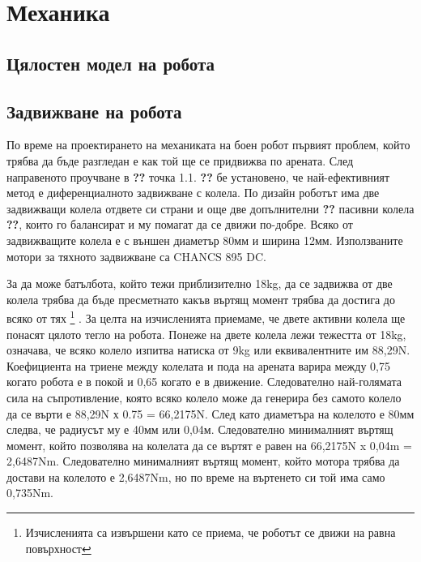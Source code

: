\chapter{Механика}

 
\section{Цялостен модел на робота}


\section{Задвижване на робота}

По време на проектирането на механиката на боен робот първият проблем, който трябва да бъде разгледан е как той ще се придвижва по арената. След направеното проучване в \textbf{??} точка 1.1. \textbf{??} бе установено, че най-ефективният метод е диференциалното задвижване с колела. По дизайн роботът има две задвижващи колела отдвете си страни и още две допълнителни \textbf{??} пасивни колела \textbf{??}, които го балансират и му помагат да се движи по-добре. Всяко от задвижващите колела е с външен диаметър 80мм и ширина 12мм. Използваните мотори за тяхното задвижване са CHANCS 895 DC.

За да може батълбота, който тежи приблизително 18kg, да се задвижва от две колела трябва да бъде пресметнато какъв въртящ момент трябва да достига до всяко от тях
\footnote{Изчисленията са извършени като се приема, че роботът се движи на равна повърхност}
. За целта на изчисленията приемаме, че двете активни колела ще понасят цялото тегло на робота. Понеже на двете колела лежи тежестта от 18kg, означава, че всяко колело изпитва натиска от 9kg или еквивалентните им 88,29N. Коефициента на триене между колелата и пода на арената варира между 0,75 когато робота е в покой и 0,65 когато е в движение. Следователно най-голямата сила на съпротивление, която всяко колело може да генерира без самото колело да се върти е 88,29N х 0.75 = 66,2175N. След като диаметъра на колелото е 80мм следва, че радиусът му е 40мм или 0,04м. Следователно минималният въртящ момент, който позволява на колелата да се въртят е равен на 66,2175N x 0,04m = 2,6487Nm. Следователно минималният въртящ момент, който мотора трябва да достави на колелото е 2,6487Nm, но по време на въртенето си той има само 0,735Nm.


